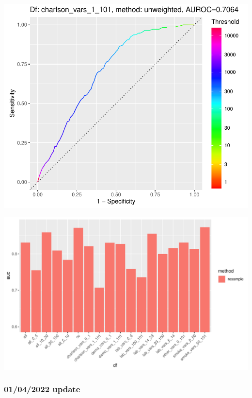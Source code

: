\documentclass[12pt]{article}
\begin{document}
\begin{center}
\includegraphics[width=.45\textwidth]{roc/all_unweighted_charlson_vars_1_101.pdf}
\end{center}

\pagebreak
\begin{center}
\includegraphics[width=\textwidth]{all_aucs.pdf}
\end{center}





\pagebreak
\subsubsection*{01/04/2022 update}
\end{document}
